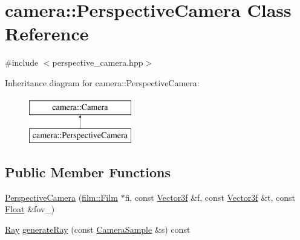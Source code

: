 \hypertarget{classcamera_1_1PerspectiveCamera}{}\section{camera\+::Perspective\+Camera Class Reference}
\label{classcamera_1_1PerspectiveCamera}


{\ttfamily \#include $<$perspective\+\_\+camera.\+hpp$>$}

Inheritance diagram for camera\+::Perspective\+Camera\+:\begin{figure}[H]
\begin{center}
\leavevmode
\includegraphics[height=2.000000cm]{classcamera_1_1PerspectiveCamera}
\end{center}
\end{figure}
\subsection*{Public Member Functions}
\begin{DoxyCompactItemize}
\item 
\mbox{\hyperlink{classcamera_1_1PerspectiveCamera_a4d23517122064d22a7af054cc879c409}{Perspective\+Camera}} (\mbox{\hyperlink{classfilm_1_1Film}{film\+::\+Film}} $\ast$fi, const \mbox{\hyperlink{cyclop_8hpp_a5a0a2e85b081623ef3f7e7e8d43024f5}{Vector3f}} \&f, const \mbox{\hyperlink{cyclop_8hpp_a5a0a2e85b081623ef3f7e7e8d43024f5}{Vector3f}} \&t, const \mbox{\hyperlink{cyclop_8hpp_a07afd7094cb489cbd514c76e6f55d34f}{Float}} \&fov\+\_\+)
\item 
\mbox{\hyperlink{classRay}{Ray}} \mbox{\hyperlink{classcamera_1_1PerspectiveCamera_a15d07767da0fb7258437095b6a41f30b}{generate\+Ray}} (const \mbox{\hyperlink{structcamera_1_1CameraSample}{Camera\+Sample}} \&s) const
\end{DoxyCompactItemize}
